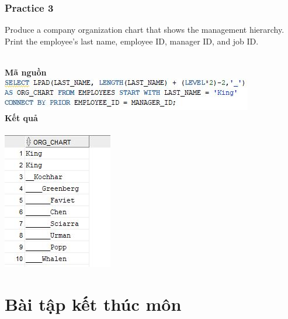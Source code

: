 \documentclass[12pt,a4paper]{report}
\begin{document}
\subsection{Practice 3}
\begin{boxedminipage}[t]{15.5cm}
	Produce a company organization chart that shows the management hierarchy. 
	Print the employee’s last name, employee ID, manager ID, and job ID.
	
	
	
\end{boxedminipage}
\newline
\\
\textbf{Mã nguồn}
\\
\newline
\includegraphics[scale=1]{311.jpg}\\
\textbf{Kết quả}\\\\
\includegraphics[scale=1]{k311.jpg}

\chapter{Bài tập kết thúc môn}
\end{document}
